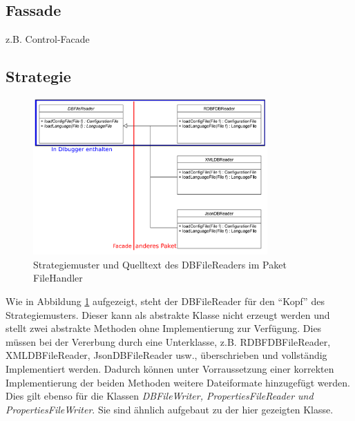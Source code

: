\documentclass[parskip=full]{scrartcl}
\begin{document}
\subsection{Fassade}
z.B. Control-Facade

\newpage
\subsection{Strategie}
\begin{figure}[!h]
\centering
\includegraphics[width=0.8\textwidth]{document_data/Strategy_uml_d.pdf}

\caption{Strategiemuster und Quelltext des DBFileReaders im Paket FileHandler}
\label{fig:strategy_fh}
\end{figure}
Wie in Abbildung \ref{fig:strategy_fh} aufgezeigt, steht der DBFileReader für den \enquote{Kopf} des Strategiemusters.
Dieser kann als abstrakte Klasse nicht erzeugt werden und stellt zwei abstrakte Methoden ohne Implementierung zur Verfügung.
Dies müssen bei der Vererbung durch eine Unterklasse, z.B. RDBFDBFileReader, XMLDBFileReader, JsonDBFileReader usw., überschrieben und vollständig Implementiert werden.
Dadurch können unter Vorraussetzung einer korrekten Implementierung der beiden Methoden weitere Dateiformate hinzugefügt werden.
Dies gilt ebenso für die Klassen \textit{DBFileWriter, PropertiesFileReader und PropertiesFileWriter}. Sie sind ähnlich aufgebaut zu der hier gezeigten Klasse.
\end{document}
